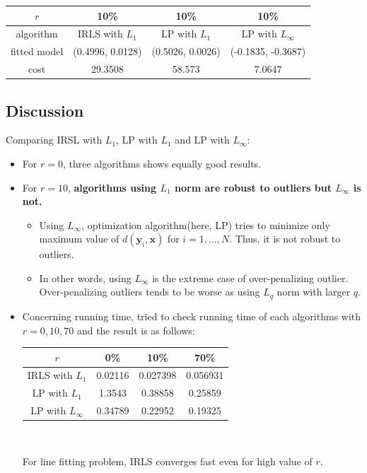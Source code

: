 \documentclass[paper=a4, fontsize=11pt]{scrartcl} %
\numberwithin{equation}{section} %
\numberwithin{figure}{section} %
\numberwithin{table}{section} %
\renewcommand{\vec}[1]{\mathbf{#1}}
\begin{document}
\begin{center}
    \begin{tabular}{ | c | c | c | c |}
    \hline
    $r$			&	10\%				&	10\%				&	10\%				 \\ \hline
    algorithm		&	IRLS	 with $L_{1}$	&	LP	 with $L_{1}$	&	LP with $L_{\infty}$		\\ \hline	
    fitted model		&	(0.4996, 0.0128) 	& 	(0.5026, 0.0026) 	& 	(-0.1835, -0.3687)	\\ \hline
    cost 			& 	29.3508			& 	58.573 			& 	7.0647			 \\ \hline
    \end{tabular}
\end{center} 


\subsection{Discussion}

Comparing IRSL with $L_{1}$, LP with $L_{1}$ and LP with $L_{\infty}$:

\begin{itemize}
\item For $r = 0$, three algorithms shows equally good results. 
\item For $r = 10$, \textbf{algorithms using $L_{1}$ norm are robust to outliers but $L_{\infty}$ is not.}
	\begin{itemize}
		\item Using $L_{\infty}$, optimization algorithm(here, LP) tries to minimize only maximum value of $d(\vec{y}_{i}, \vec{x})$ for $i = 1, \dots, N$. Thus, it is not robust to outliers.
		\item In other words, using $L_{\infty}$ is the extreme case of over-penalizing outlier. Over-penalizing outliers tends to be worse as using $L_{q}$ norm with larger $q$.
	\end{itemize} 
\item Concerning running time, tried to check running time of each algorithms with $r = 0, 10, 70$ and the result is as follows:

\begin{center}
    \begin{tabular}{ | c | c | c | c |}
    \hline
    $r$				&	0\%				&	10\%				&	70\%				 \\ \hline
    IRLS with $L_{1}$		&	0.02116			&	0.027398			&	0.056931		\\ \hline	
    LP	 with $L_{1}$		&	1.3543 			& 	0.38858		 	& 	0.25859		\\ \hline
    LP with $L_{\infty}$ 	& 	0.34789			& 	0.22952 			& 	0.19325		 \\ \hline
    \end{tabular} \\
\end{center}  

    For line fitting problem, IRLS converges fast even for high value of $r$.
\end{itemize}


\end{document}
